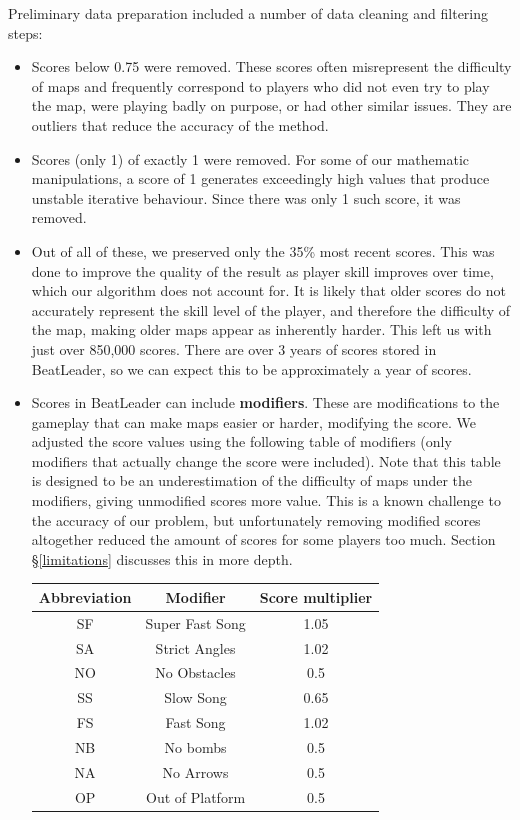\documentclass[12pt,a4paper]{article}
\begin{document}
Preliminary data preparation included a number of data cleaning and filtering steps:
\begin{itemize}
\item Scores below 0.75 were removed. These scores often misrepresent the difficulty of maps and frequently correspond to players who did not even try to play the map, were playing badly on purpose, or had other similar issues. They are outliers that reduce the accuracy of the method.
\item Scores (only 1) of exactly 1 were removed. For some of our mathematic manipulations, a score of 1 generates exceedingly high values that produce unstable iterative behaviour. Since there was only 1 such score, it was removed.
\item Out of all of these, we preserved only the 35\% most recent scores. This was done to improve the quality of the result as player skill improves over time, which our algorithm does not account for. It is likely that older scores do not accurately represent the skill level of the player, and therefore the difficulty of the map, making older maps appear as inherently harder. This left us with just over 850,000 scores. There are over 3 years of scores stored in BeatLeader, so we can expect this to be approximately a year of scores.
\item Scores in BeatLeader can include {\bf{modifiers}}. These are modifications to the gameplay that can make maps easier or harder, modifying the score. We adjusted the score values using the following table of modifiers (only modifiers that actually change the score were included). Note that this table is designed to be an underestimation of the difficulty of maps under the modifiers, giving unmodified scores more value. This is a known challenge to the accuracy of our problem, but unfortunately removing modified scores altogether reduced the amount of scores for some players too much. Section \S \ref{limitations} discusses this in more depth.\\
\begin{tabular}{ |c|c|c| }
\hline
{\bf{Abbreviation}}&{\bf{Modifier}}&Score multiplier\\
\hline
SF&Super Fast Song&1.05\\
\hline
SA&Strict Angles&1.02\\
\hline
NO&No Obstacles&0.5\\
\hline
SS&Slow Song&0.65\\
\hline
FS&Fast Song&1.02\\
\hline
NB&No bombs&0.5\\
\hline
NA&No Arrows&0.5\\
\hline
OP&Out of Platform&0.5\\
\hline
\end{tabular}
\end{itemize}
\end{document}
